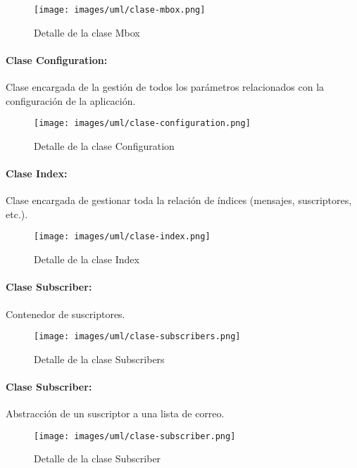 \begin{figure}[H]
	\centering
 	\texttt{[image: images/uml/clase-mbox.png]}
	\caption{Detalle de la clase Mbox}
	\label{fig:uml:mbox-class}
\end{figure}

\paragraph{Clase Configuration:}

Clase encargada de la gestión de todos los parámetros relacionados con la
configuración de la aplicación.

\begin{figure}[H]
	\centering
 	\texttt{[image: images/uml/clase-configuration.png]}
	\caption{Detalle de la clase Configuration}
	\label{fig:uml:configuration-class}
\end{figure}

\paragraph{Clase Index:}

Clase encargada de gestionar toda la relación de índices (mensajes, suscriptores,
etc.).

\begin{figure}[H]
	\centering
 	\texttt{[image: images/uml/clase-index.png]}
	\caption{Detalle de la clase Index}
	\label{fig:uml:index-class}
\end{figure}

\paragraph{Clase Subscriber:}

Contenedor de suscriptores.

\begin{figure}[H]
	\centering
 	\texttt{[image: images/uml/clase-subscribers.png]}
	\caption{Detalle de la clase Subscribers}
	\label{fig:uml:subscribers-class}
\end{figure}

\paragraph{Clase Subscriber:}

Abstracción de un suscriptor a una lista de correo.

\begin{figure}[H]
	\centering
 	\texttt{[image: images/uml/clase-subscriber.png]}
	\caption{Detalle de la clase Subscriber}
	\label{fig:uml:subscriber-class}
\end{figure}

